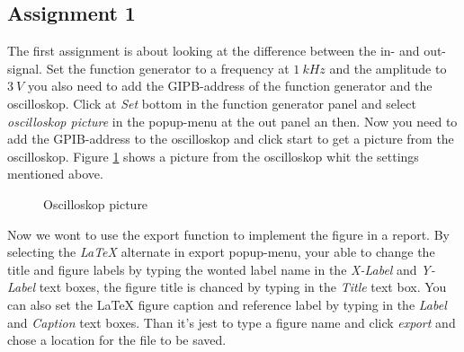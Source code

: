\subsection{Assignment 1}
The first assignment is about looking at the difference between the in- and out-signal. Set the function generator to a frequency at $1~kHz$ and the amplitude to $3~V$ you also need to add the GIPB-address of the function generator and the oscilloskop. Click at \emph{Set} bottom in the function generator panel and select \emph{oscilloskop picture} in the popup-menu at the out panel an then. Now you need to add the GPIB-address to the oscilloskop and click start to get a picture from the oscilloskop. Figure \ref{oscilloskopPicture} shows a picture from the oscilloskop whit the settings mentioned above. 
\begin{center}
	\begin{figure}[h]
		\caption{Oscilloskop picture}
		\label{oscilloskopPicture}
	\end{figure}
\end{center}

Now we wont to use the export function to implement the figure in a report. By selecting the \emph{LaTeX} alternate in export popup-menu, your able to change the title and  figure labels  by typing the wonted label name in the \emph{X-Label} and \emph{Y-Label} text boxes, the figure title is chanced by typing in the \emph{Title} text box. You can also set the LaTeX figure caption and reference label by typing in the \emph{Label} and \emph{Caption} text boxes. Than it's jest to type a figure name and click \emph{export} and chose a location for the file to be saved.

